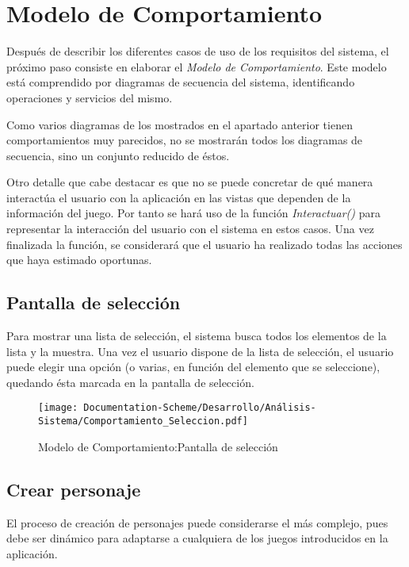 
\section{Modelo de Comportamiento}
Después de describir los diferentes casos de uso de los requisitos del sistema, el próximo paso consiste
en elaborar el \textit{Modelo de Comportamiento}. Este modelo está comprendido por diagramas de secuencia 
del sistema, identificando operaciones y servicios del mismo. \medskip

Como varios diagramas de los mostrados en el apartado anterior tienen comportamientos 
muy parecidos, no se mostrarán todos los diagramas de secuencia, sino un conjunto reducido de éstos.\medskip

Otro detalle que cabe destacar es que no se puede concretar de qué manera interactúa el usuario con la aplicación 
en las vistas que dependen de la información del juego. Por tanto se hará uso de la función \textit{Interactuar()} 
para representar la interacción del usuario con el sistema en estos casos. Una vez finalizada 
la función, se considerará que el usuario ha realizado todas las acciones que haya estimado oportunas.

\subsection{Pantalla de selección}
Para mostrar una lista de selección, el sistema busca todos los elementos de la lista y 
la muestra. Una vez el usuario dispone de la lista de selección, el usuario puede 
elegir una opción (o varias, en función del elemento que se seleccione), quedando ésta 
marcada en la pantalla de selección.

\begin{figure}[H]
    \centering
    \texttt{[image: Documentation-Scheme/Desarrollo/Análisis-Sistema/Comportamiento\_Seleccion.pdf]}
    \caption{Modelo de Comportamiento:Pantalla de selección}
    \label{Comportamiento_seleccion}
\end{figure}


\subsection{Crear personaje}
El proceso de creación de personajes puede considerarse el más complejo, pues debe ser dinámico para 
adaptarse a cualquiera de los juegos introducidos en la aplicación.\medskip

